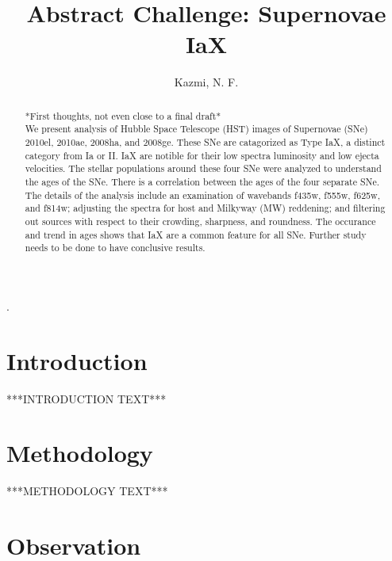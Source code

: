 \documentclass[preprint2]{aastex}
\begin{document}
\title{Abstract Challenge: Supernovae IaX }

\author{Kazmi, N. F.}

\begin{abstract}
*First thoughts, not even close to a final draft*\\
We present analysis of Hubble Space Telescope (HST) images of Supernovae (SNe)
 2010el, 2010ae, 2008ha, and 2008ge. These SNe are catagorized as Type IaX, a
 distinct category from Ia or II. IaX are notible for their low spectra luminosity and low
 ejecta velocities. The stellar populations around these four SNe were analyzed to
 understand the ages of the SNe. There is a correlation between the ages of the four
 separate SNe. The details of the analysis include an examination of wavebands 
 f435w, f555w, f625w, and f814w; adjusting the spectra for host and Milkyway (MW)
 reddening; and filtering out sources with respect to their crowding, sharpness, and
 roundness. The occurance and trend in ages shows that IaX are a common feature for
 all SNe. Further study needs to be done to have conclusive results. 

\end{abstract}.



\section{Introduction}

***INTRODUCTION TEXT***

\section{Methodology}

***METHODOLOGY TEXT***

\section{Observation}
\end{document}
